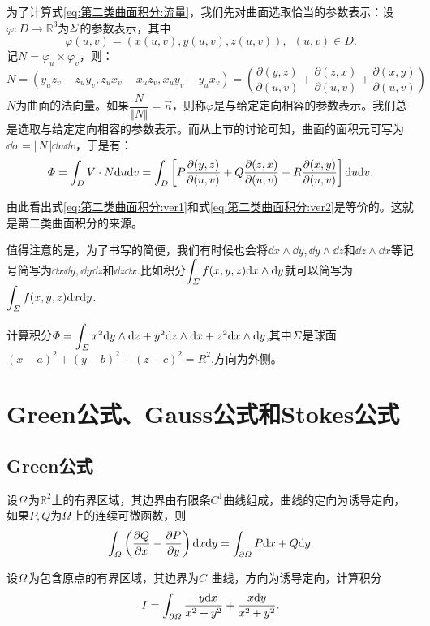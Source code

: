     为了计算式\eqref{eq:第二类曲面积分:流量}，我们先对曲面选取恰当的参数表示：设\(\varphi:D\to\mathbb{R}^3\)为\(\mit\Sigma\)的参数表示，其中\[\varphi(u,v)=(x(u,v),y(u,v),z(u,v)),\enspace(u,v)\in D.\]记\(N=\varphi_u\times\varphi_v\)，则：\[N=(y_uz_v-z_uy_v,z_ux_v-x_uz_v,x_uy_v-y_ux_v)=\left(\frac{\partial(y,z)}{\partial(u,v)}+\frac{\partial(z,x)}{\partial(u,v)}+\frac{\partial(x,y)}{\partial(u,v)}\right)\]
    \(N\)为曲面的法向量。如果\(\dfrac{N}{\Vert N\Vert}=\vec{n}\)，则称\(\varphi\)是与给定定向相容的参数表示。我们总是选取与给定定向相容的参数表示。而从上节的讨论可知，曲面的面积元可写为\(\dd\sigma=\Vert N\Vert\dd u\dd v\)，于是有：
    \begin{equation}
        \mit\Phi = \int_{D}V\cdot N\mathrm{d} u\mathrm{d} v = \int_{D}\left[P\frac{\partial(y,z)}{\partial(u,v)}+Q\frac{\partial(z,x)}{\partial(u,v)}+R\frac{\partial(x,y)}{\partial(u,v)}\right]\mathrm{d} u\mathrm{d} v.\label{eq:第二类曲面积分:ver1}
    \end{equation}

    由此看出式\eqref{eq:第二类曲面积分:ver1}和式\eqref{eq:第二类曲面积分:ver2}是等价的。这就是第二类曲面积分的来源。

    值得注意的是，为了书写的简便，我们有时候也会将\(\dd x\wedge\dd y,\dd y\wedge\dd z\)和\(\dd z\wedge\dd x\)等记号简写为\(\dd x\dd y,\dd y\dd z\)和\(\dd z\dd x\).比如积分\(\displaystyle\int_{\mit\Sigma}f(x,y,z)\mathrm{d} x\wedge\mathrm{d} y\)就可以简写为\(\displaystyle\int_{\mit\Sigma}f(x,y,z)\mathrm{d} x\mathrm{d} y\).
    \begin{example}
        计算积分\(\displaystyle\mit\Phi=\int_{\mit\Sigma}x^2\mathrm{d}y\wedge\mathrm{d}z+y^2\mathrm{d}z\wedge\mathrm{d}x+z^2\mathrm{d}x\wedge\mathrm{d}y\),其中\(\mit\Sigma\)是球面\((x-a)^2+(y-b)^2+(z-c)^2=R^2\),方向为外侧。
    \end{example}

\section{Green公式、Gauss公式和Stokes公式}
    \subsection{Green公式}
    \begin{theorem}[Green公式]
        设\(\mit\Omega\)为\(\mathbb{R}^2\)上的有界区域，其边界由有限条\(C^1\)曲线组成，曲线的定向为诱导定向，如果\(P,Q\)为\(\mit\Omega\)上的连续可微函数，则\[\int_{\mit\Omega}\left(\frac{\partial Q}{\partial x}-\frac{\partial P}{\partial y}\right)\mathrm{d} x\mathrm{d} y=\int_{\partial\mit\Omega}P\mathrm{d} x+Q\mathrm{d} y.\]
    \end{theorem}
    \begin{example}
        设\(\mit\Omega\)为包含原点的有界区域，其边界为\(C^1\)曲线，方向为诱导定向，计算积分\[I=\int_{\partial\mit\Omega}\frac{-y\mathrm{d} x}{x^2+y^2}+\frac{x\mathrm{d} y}{x^2+y^2}.\]
    \end{example}

